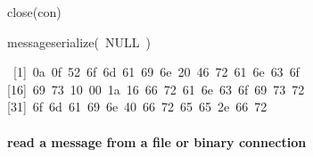 \documentclass[10pt,twocolumn,a4paper]{article}
\newenvironment{Hinput}%
{}%
{}%
\newenvironment{Houtput}%
{}%
{}%
\newenvironment{Hchunk}%
{\vspace{0.5em}\par\begin{flushleft}}%
{\end{flushleft}}%
\newcommand{\hlstd}[1]{\textcolor[rgb]{0,0,0}{#1}}%
\newcommand{\hlfunctioncall}[1]{\textcolor[rgb]{1,0,0}{#1}}%
\newcommand{\hlkeyword}[1]{\textcolor[rgb]{0,0,0}{#1}}%
\newcommand{\hlsymbol}[1]{\textcolor[rgb]{0,0,0}{#1}}%
\newcommand{\hlprompt}[1]{\textcolor[rgb]{0,0,0}{#1}}%
\begin{document}
\begin{Hchunk}
\begin{normalsize}
\begin{Hinput}
\end{Hinput}


\begin{Hinput}

\ttfamily\noindent
\hlprompt{\usebox{\hlnormalsizeboxgreaterthan}{\ }}\hlfunctioncall{close}\hlkeyword{(}\hlsymbol{con}\hlkeyword{)}\mbox{}
\normalfont

\end{Hinput}


\begin{Hinput}

\ttfamily\noindent
\hlprompt{\usebox{\hlnormalsizeboxgreaterthan}{\ }}\hlsymbol{message}\hlkeyword{\usebox{\hlnormalsizeboxdollar}}\hlfunctioncall{serialize}\hlkeyword{(}{\ }NULL{\ }\hlkeyword{)}\mbox{}
\normalfont

\end{Hinput}

\begin{Houtput}

\ttfamily\noindent
{\ }[1]{\ }0a{\ }0f{\ }52{\ }6f{\ }6d{\ }61{\ }69{\ }6e{\ }20{\ }46{\ }72{\ }61{\ }6e{\ }63{\ }6f\hspace*{\fill}\\
\hlstd{}[16]{\ }69{\ }73{\ }10{\ }00{\ }1a{\ }16{\ }66{\ }72{\ }61{\ }6e{\ }63{\ }6f{\ }69{\ }73{\ }72\hspace*{\fill}\\
\hlstd{}[31]{\ }6f{\ }6d{\ }61{\ }69{\ }6e{\ }40{\ }66{\ }72{\ }65{\ }65{\ }2e{\ }66{\ }72\hspace*{\fill}\hlstd{}\mbox{}
\normalfont

\end{Houtput}

\end{normalsize}
\end{Hchunk}


\paragraph{read a message from a file or binary connection}
\end{document}
